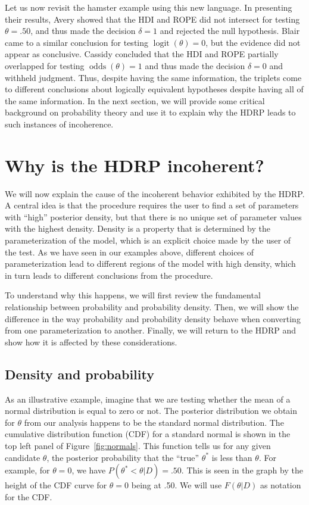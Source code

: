 \documentclass[9pt,twocolumn,twoside]{cidlab-draft}\templatetype{cidlab-invited}
\newcommand{\hdr}{HDRP}
\DeclareMathOperator*{\oddss}{odds}
\DeclareMathOperator*{\logit}{logit}
\begin{document}
Let us now revisit the hamster example using this new language. In presenting their results, Avery showed that the HDI and ROPE did not intersect for testing $\theta=.50$, and thus made the decision $\delta=1$ and rejected the null hypothesis. Blair came to a similar conclusion for testing $\logit(\theta)=0$, but the evidence did not appear as conclusive. Cassidy concluded that the HDI and ROPE partially overlapped for testing $\oddss(\theta)=1$ and thus made the decision $\delta=0$ and withheld judgment. Thus, despite having the same information, the triplets come to different conclusions about logically equivalent hypotheses despite having all of the same information. In the next section, we will provide some critical background on probability theory and use it to explain why the \hdr{} leads to such instances of incoherence. 

\section*{Why is the \hdr{} incoherent?}

We will now explain the cause of the incoherent behavior exhibited by the \hdr{}. A central idea is that the procedure requires the user to find a set of parameters with ``high'' posterior density, but that there is no unique set of parameter values with the highest density. Density is a property that is determined by the parameterization of the model, which is an explicit choice made by the user of the test. As we have seen in our examples above, different choices of parameterization lead to different regions of the model with high density, which in turn leads to different conclusions from the procedure.

To understand why this happens, we will first review the fundamental relationship between probability and probability density. Then, we will show the difference in the way probability and probability density behave when converting from one parameterization to another. Finally, we will return to the \hdr{} and show how it is affected by these considerations.  
    
\subsection*{Density and probability}

As an illustrative example, imagine that we are testing whether the mean of a normal distribution is equal to zero or not. The posterior distribution we obtain for $\theta$ from our analysis happens to be the standard normal distribution. The cumulative distribution function (CDF) for a standard normal is shown in the top left panel of Figure~\ref{fig:normals}. This function tells us for any given candidate $\theta$, the posterior probability that the ``true'' $\theta^*$ is less than $\theta$. For example, for $\theta=0$, we have $P(\theta^*<\theta|D) = .50$. This is seen in the graph by the height of the CDF curve for $\theta=0$ being at .50. We will use $F(\theta|D)$ as notation for the CDF.
\end{document}
